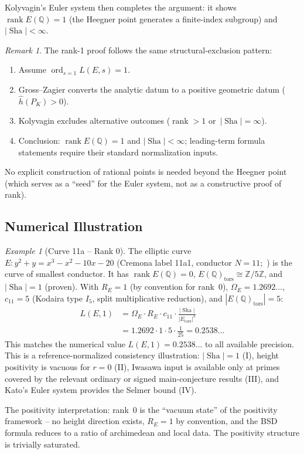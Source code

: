 \documentclass[aps,prd,twocolumn,superscriptaddress,nofootinbib,floatfix]{revtex4-2}
\theoremstyle{definition}
\theoremstyle{remark}
\newtheorem{remark}[theorem]{Remark}
\newtheorem{example}[theorem]{Example}
\DeclareMathOperator{\ord}{ord}
\DeclareMathOperator{\rank}{rank}
\DeclareMathOperator{\Sha}{Sha}
\begin{document}
Kolyvagin's Euler system then completes the argument: it shows $\rank E(\mathbb{Q}) = 1$ (the Heegner point generates a finite-index subgroup) and $|\Sha| < \infty$.

\begin{remark}
The rank-1 proof follows the same structural-exclusion pattern:
\begin{enumerate}
\item Assume $\ord_{s=1} L(E,s) = 1$.
\item Gross--Zagier converts the analytic datum to a positive geometric datum ($\hat{h}(P_K) > 0$).
\item Kolyvagin excludes alternative outcomes ($\rank > 1$ or\allowbreak\ $|\Sha| = \infty$).
\item Conclusion: $\rank E(\mathbb{Q}) = 1$ and $|\Sha| < \infty$; leading-term formula statements require their standard normalization inputs.
\end{enumerate}
No explicit construction of rational points is needed beyond the Heegner point (which serves as a ``seed'' for the Euler system, not as a constructive proof of rank).
\end{remark}

\subsection{Numerical Illustration}

\begin{example}[Curve 11a -- Rank 0]
\label{ex:11a}
The elliptic curve $E: y^2 + y = x^3 - x^2 - 10x - 20$ (Cremona label 11a1, conductor $N = 11$;~\cite{LMFDB}) is the curve of smallest conductor. It has $\rank E(\mathbb{Q}) = 0$, $E(\mathbb{Q})_{\mathrm{tors}} \cong \mathbb{Z}/5\mathbb{Z}$, and $|\Sha| = 1$ (proven). With $R_E = 1$ (by convention for rank~0), $\Omega_E = 1.2692\ldots$, $c_{11} = 5$ (Kodaira type $I_5$, split multiplicative reduction), and $|E(\mathbb{Q})_{\mathrm{tors}}| = 5$:
\[
\begin{aligned}
  L(E,1)
  &= \Omega_E \cdot R_E \cdot c_{11}
     \cdot \frac{|\Sha|}{|E_{\mathrm{tors}}|^2} \\
  &= 1.2692 \cdot 1 \cdot 5 \cdot \frac{1}{25}
   = 0.2538\ldots
\end{aligned}
\]
This matches the numerical value $L(E,1) = 0.2538\ldots$ to all available precision. This is a reference-normalized consistency illustration: $|\Sha| = 1$ (I), height positivity is vacuous for $r = 0$ (II), Iwasawa input is available only at primes covered by the relevant ordinary or signed main-conjecture results (III), and Kato's Euler system provides the Selmer bound (IV).

The positivity interpretation: rank~0 is the ``vacuum state'' of the positivity framework -- no height direction exists, $R_E = 1$ by convention, and the BSD formula reduces to a ratio of archimedean and local data. The positivity structure is trivially saturated.
\end{example}
\end{document}
